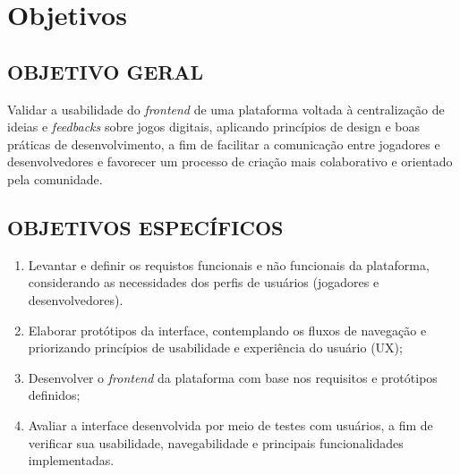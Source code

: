 \chapter{Objetivos} \label{cha:objetivos}


\section{OBJETIVO GERAL} \label{sec:objetivo_geral}

Validar a usabilidade do \textit{frontend} de uma plataforma voltada à centralização de ideias e \textit{feedbacks} sobre jogos digitais, aplicando princípios de design e boas práticas de desenvolvimento, a fim de facilitar a comunicação entre jogadores e desenvolvedores e favorecer um processo de criação mais colaborativo e orientado pela comunidade.

\section{OBJETIVOS ESPECÍFICOS} \label{sec:objetivos_especificos}

\begin{enumerate}
    \item  Levantar e definir os requistos funcionais e não funcionais da plataforma, considerando as necessidades dos perfis de usuários (jogadores e desenvolvedores).


    \item Elaborar protótipos da interface, contemplando os fluxos de navegação e priorizando princípios de usabilidade e experiência do usuário (UX);    

    \item Desenvolver o \textit{frontend} da plataforma com base nos requisitos e protótipos definidos;
        
    \item Avaliar a interface desenvolvida por meio de testes com usuários, a fim de verificar sua usabilidade, navegabilidade e principais funcionalidades implementadas.
\end{enumerate}